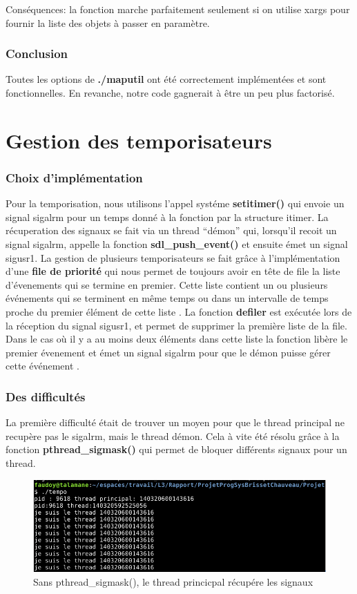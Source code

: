 \documentclass[a4paper]{article}
\begin{document}
Conséquences: la fonction marche parfaitement seulement si on utilise xargs pour fournir la liste des objets à passer en paramètre.

\section{Conclusion}
Toutes les options de \textbf{./maputil} ont été correctement implémentées et sont fonctionnelles. En revanche, notre code gagnerait à être un peu plus factorisé. 

\part{Gestion des temporisateurs}

\section{Choix d'implémentation}
Pour la temporisation, nous utilisons l'appel systéme \textbf{setitimer()} qui envoie un signal sigalrm pour un temps donné à la fonction par la structure itimer.
\newline La récuperation des signaux se fait via un thread ``démon'' qui, lorsqu'il recoit un signal sigalrm, appelle la fonction \textbf{sdl\_push\_event()} et ensuite émet un signal sigusr1.
\newline La gestion de plusieurs temporisateurs se fait grâce à l'implémentation d'une \textbf{file de priorité} qui nous permet de toujours avoir en tête de file la liste d'évenements qui se termine en premier. Cette liste contient un ou plusieurs événements qui se terminent en même temps ou dans un intervalle de temps proche du premier élément de cette liste .
\newline La fonction \textbf{defiler} est exécutée lors de la réception du signal sigusr1, et permet de supprimer la première liste de la file. Dans le cas où il y a au moins deux éléments dans cette liste la fonction libère le premier évenement et émet un signal sigalrm pour que le démon puisse gérer cette événement . 

\section{Des difficultés}
La première difficulté était de trouver un moyen pour que le thread principal ne recupère pas le sigalrm, mais le thread démon. Cela à vite été résolu grâce à la fonction \textbf{pthread\_sigmask()} qui permet de bloquer différents signaux pour un thread.
\\
\begin{figure}[!h]
  \includegraphics[scale=0.5]{probleme_thread.png}
  \caption{Sans pthread\_sigmask(), le thread princicpal récupére les signaux}  
\end{figure}
\end{document}
